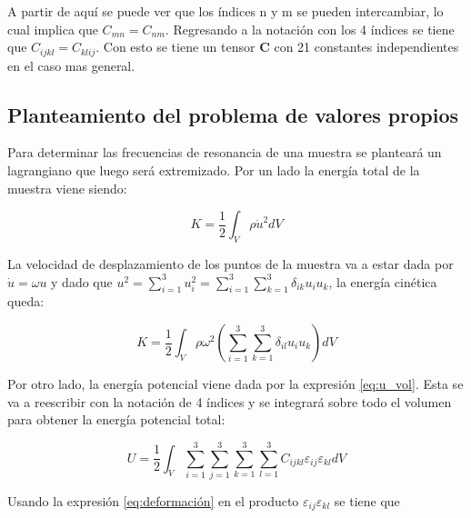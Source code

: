 \documentclass[12pt]{article}
\begin{document}
A partir de aquí se puede ver que los índices n y m se pueden intercambiar, lo cual implica que $C_{mn} = C_{nm}$. Regresando a la notación con los 4 índices se tiene que $C_{ijkl} = C_{klij}$. Con esto se tiene un tensor $\bm{C}$ con 21 constantes independientes en el caso mas general. 


\subsection{Planteamiento del problema de valores propios}

Para determinar las frecuencias de resonancia de una muestra se planteará un lagrangiano que luego será extremizado. Por un lado la energía total de la muestra viene siendo:

\begin{equation}
	K = \frac{1}{2} \int_{V}{\rho \dot{u}^2} dV
\end{equation}

La velocidad de desplazamiento de los puntos de la muestra va a estar dada por $\dot{u} = \omega{u}$ y dado que $u^2 = \sum_{i=1}^{3}{u_i^2} = \sum_{i=1}^{3}{\sum_{k=1}^{3}{\delta_{ik}u_i u_k}}$, la energía cinética queda:

\begin{equation}
	K = \frac{1}{2} \int_{V}{\rho \omega^2 \left(\sum_{i=1}^{3}{\sum_{k=1}^{3}{\delta_{il} u_i u_k}} \right) dV}
\end{equation}

Por otro lado, la energía potencial viene dada por la expresión \ref{eq:u_vol}. Esta se va a reescribir con la notación de 4 índices y se integrará sobre todo el volumen para obtener la energía potencial total: 

\begin{equation}
	U = \frac{1}{2} \int_{V}{\sum_{i=1}^{3}\sum_{j=1}^{3}\sum_{k=1}^{3}\sum_{l=1}^{3}{C_{ijkl}\varepsilon_{ij}\varepsilon_{kl}}dV}
	\label{eq:U_raw}
\end{equation}

Usando la expresión \ref{eq:deformación} en el producto $\varepsilon_{ij}\varepsilon_{kl}$ se tiene que
\end{document}
